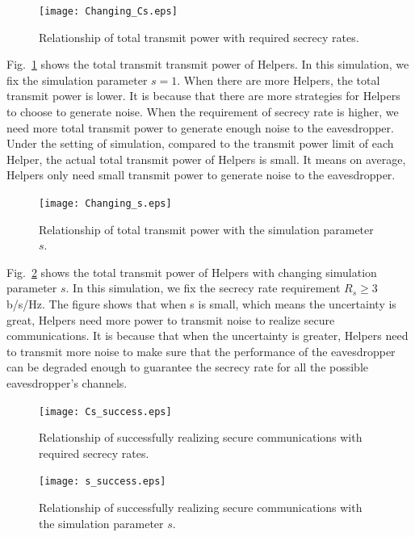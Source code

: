 \documentclass[conference]{IEEEtran}
\begin{document}
\begin{figure}[!ht]
	\centering
	\texttt{[image: Changing\_Cs.eps]} %
	\caption{Relationship of total transmit power with required secrecy rates.}
	\label{fig:Changing_Cs}
\end{figure}

Fig.~\ref{fig:Changing_Cs} shows the total transmit transmit power of Helpers. In this simulation, we fix the simulation parameter $s = 1$. When there are more Helpers, the total transmit power is lower. It is because that there are more strategies for Helpers to choose to generate noise. When the requirement of secrecy rate is higher, we need more total transmit power to generate enough noise to the eavesdropper. Under the setting of simulation, compared to the transmit power limit of each Helper, the actual total transmit power of Helpers is small. It means on average, Helpers only need small transmit power to generate noise to the eavesdropper.

\begin{figure}[!ht]
	\centering
	\texttt{[image: Changing\_s.eps]} %
	\caption{Relationship of total transmit power with the simulation parameter $s$.}
	\label{fig:Changing_s}
\end{figure}

Fig.~\ref{fig:Changing_s} shows the total transmit power of Helpers with changing simulation parameter $s$. In this simulation, we fix the secrecy rate requirement $R_s \geq 3 $ b/s/Hz. The figure shows that when s is small, which means the uncertainty is great, Helpers need more power to transmit noise to realize secure communications. It is because that when the uncertainty is greater, Helpers need to transmit more noise to make sure that the performance of the eavesdropper can be degraded enough to guarantee the secrecy rate for all the possible eavesdropper's channels.

\begin{figure}[!ht]
	\centering
	\texttt{[image: Cs\_success.eps]} %
	\caption{Relationship of successfully realizing secure communications with required secrecy rates.}
	\label{fig:Cs_success}
\end{figure}
\begin{figure}[!ht]
	\centering
	\texttt{[image: s\_success.eps]} %
	\caption{Relationship of successfully realizing secure communications with the simulation parameter $s$.}
	\label{fig:s_success}
\end{figure}
\end{document}
